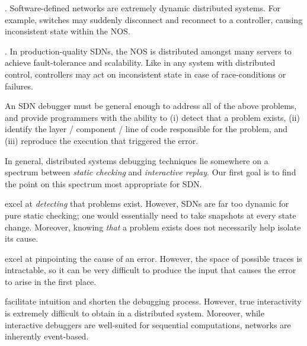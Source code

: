 \documentclass{sig-alternate-10pt}
\begin{document}
.
Software-defined networks are extremely dynamic distributed systems.
For example, switches may suddenly disconnect and reconnect to a controller, causing inconsistent state
within the NOS.

. In production-quality SDNs,
the NOS is distributed amongst many servers to achieve fault-tolerance
and scalability. Like in any system with distributed control, controllers may
act on inconsistent state in case of race-conditions or failures.

An SDN debugger must be general enough to address all of the above problems, and provide programmers
with the ability to (i) detect that a problem exists, (ii) identify the layer / component / line of code
responsible for the problem, and (iii) reproduce the execution that triggered the error.

In general, distributed systems debugging techniques lie somewhere on a spectrum between
{\it static checking} and {\it interactive replay}. Our first goal is to find
the point on this spectrum most appropriate for SDN. 

 \cite{Anteater} excel at {\it detecting} that problems
     exist. However, SDNs are far too dynamic for pure static checking; one would
     essentially need to take snapshots at every state change. Moreover,
     knowing {\it that} a problem exists does not necessarily help isolate its
     cause.

 \cite{x-trace} excel at pinpointing the cause of an
error. However, the space of possible traces is intractable, so it can be very
difficult to produce the input that causes the error to arise in the first
place.

 facilitate intuition and shorten the
      debugging process. However, true interactivity is extremely difficult to
      obtain in a distributed system. 
      Moreover, while interactive debuggers are
      well-suited for sequential
      computations, networks are inherently event-based.
\end{document}
